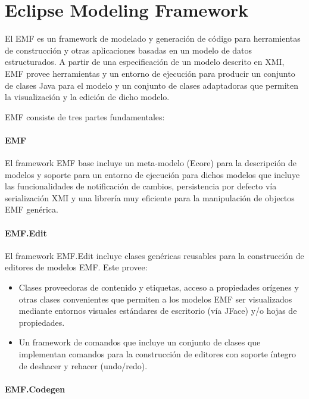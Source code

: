 \documentclass[a4paper,12pt,oneside]{book}
\begin{document}
\section{Eclipse Modeling Framework}

El EMF es un framework de modelado y generación de código para herramientas de construcción y otras aplicaciones basadas en un modelo de datos estructurados. A partir de una especificación de un modelo descrito en XMI, EMF provee herramientas y un entorno de ejecución para producir un conjunto de clases Java para el modelo y un conjunto de clases adaptadoras que permiten la visualización y la edición de dicho modelo.

EMF consiste de tres partes fundamentales:

\paragraph{EMF}

El framework EMF base incluye un meta-modelo (Ecore) para la descripción de modelos y soporte para un entorno de ejecución para dichos modelos que incluye las funcionalidades de notificación de cambios, persistencia por defecto vía serialización XMI y una librería muy eficiente para la manipulación de objectos EMF genérica. 

\paragraph{EMF.Edit}

El framework EMF.Edit incluye clases genéricas reusables para la construcción de editores de modelos EMF. Este provee:

\begin{itemize}

\item Clases proveedoras de contenido y etiquetas, acceso a propiedades orígenes y otras clases convenientes que permiten a los modelos EMF ser visualizados mediante entornos visuales estándares de escritorio (vía JFace) y/o hojas de propiedades.

\item Un framework de comandos que incluye un conjunto de clases que implementan comandos para la construcción de editores con soporte íntegro de deshacer y rehacer (undo/redo).

\end{itemize}

\paragraph{EMF.Codegen}
\end{document}
